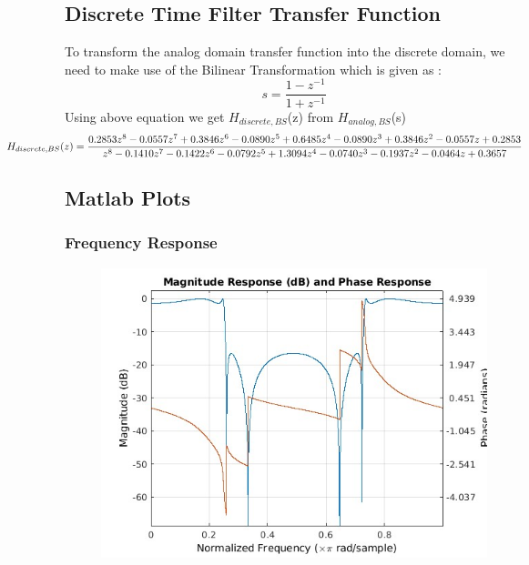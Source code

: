 \documentclass{article}
\begin{document}
\subsection{Discrete Time Filter Transfer Function}
To transform the analog domain transfer function into the discrete domain, we need to make use of the Bilinear Transformation which is given as :
\begin{equation*}
    s = \frac{1 - z^{-1}}{1 + z^{-1}}
\end{equation*}
Using  above  equation  we  get $H_{discrete,BS}$(z)  from $H_{analog,BS}$(s)
\begin{equation*}
\hspace*{-2cm}
    H_{discrete,BS}(z) = \frac{0.2853z^8 - 0.0557z^7 + 0.3846z^6 - 0.0890z^5 + 0.6485z^4 - 0.0890z^3 + 0.3846z^2 - 0.0557z + 0.2853}{z^8 - 0.1410z^7 - 0.1422z^6 - 0.0792z^5 + 1.3094z^4 - 0.0740z^3 - 0.1937z^2 - 0.0464z + 0.3657}   
\end{equation*}

\subsection{Matlab Plots}
\subsubsection{Frequency Response}
\begin{figure}[H]
\hspace*{-2.5cm}
    \centering
    \includegraphics[width=1.5\linewidth, height=0.65\textheight]{bsf_freq.jpg}
    \label{fig:my_label}
\end{figure}
\end{document}
